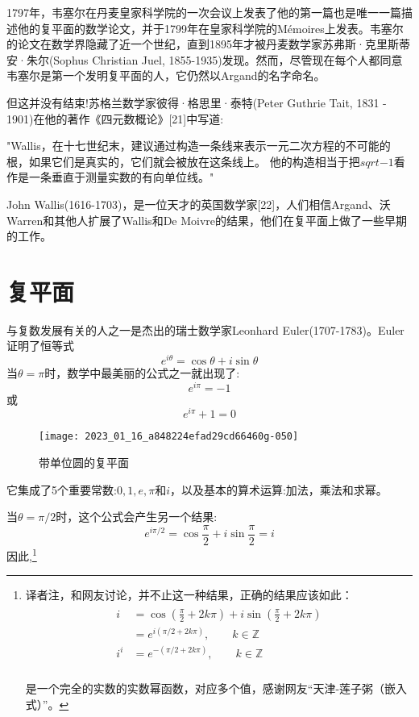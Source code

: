 1797年，韦塞尔在丹麦皇家科学院的一次会议上发表了他的第一篇也是唯一一篇描述他的复平面的数学论文，并于1799年在皇家科学院的Mémoires上发表。韦塞尔的论文在数学界隐藏了近一个世纪，直到1895年才被丹麦数学家苏弗斯·克里斯蒂安·朱尔(Sophus Christian Juel, 1855-1935)发现。然而，尽管现在每个人都同意韦塞尔是第一个发明复平面的人，它仍然以Argand的名字命名。

但这并没有结束!苏格兰数学家彼得·格思里·泰特(Peter Guthrie Tait, 1831 - 1901)在他的著作《四元数概论》[21]中写道:

\begin{CJK}{UTF8}{gkai}
    "Wallis，在十七世纪末，建议通过构造一条线来表示一元二次方程的不可能的根，如果它们是真实的，它们就会被放在这条线上。
    他的构造相当于把$sqrt{-1}$看作是一条垂直于测量实数的有向单位线。"
\end{CJK}

John Wallis(1616-1703)，是一位天才的英国数学家[22]，人们相信Argand、沃Warren和其他人扩展了Wallis和De Moivre的结果，他们在复平面上做了一些早期的工作。

\section{复平面}
与复数发展有关的人之一是杰出的瑞士数学家Leonhard Euler(1707-1783)。Euler证明了恒等式
$$
e^{i \theta}=\cos \theta+i \sin \theta
$$
当$\theta=\pi$时，数学中最美丽的公式之一就出现了:
$$
e^{i \pi}=-1
$$
或
$$
e^{i \pi}+1=0
$$

\begin{figure}[h!]
    \centering
    \texttt{[image: 2023\_01\_16\_a848224efad29cd66460g-050]}
    \caption{带单位圆的复平面}
\end{figure}
它集成了5个重要常数:$0,1,e, \pi$和$i$，以及基本的算术运算:加法，乘法和求幂。

当$\theta=\pi / 2$时，这个公式会产生另一个结果:
$$
e^{i \pi / 2}=\cos \frac{\pi}{2}+i \sin \frac{\pi}{2}=i
$$
因此,\footnote{译者注，和网友讨论，并不止这一种结果，正确的结果应该如此：
\begin{align*}
    \begin{aligned}
        i &=  \cos (\frac{\pi}{2}+2k\pi)+i\sin(\frac{\pi}{2}+2k\pi)\\
        &=e^{i({\pi/2}+2k\pi)},\qquad k\in \mathbb{Z}\\
        i^i &= e^{-(\pi/2+2k\pi)},\qquad k\in \mathbb{Z}\\
    \end{aligned}
\end{align*}

是一个完全的实数的实数幂函数，对应多个值，感谢网友“天津-莲子粥（嵌入式）”。}

